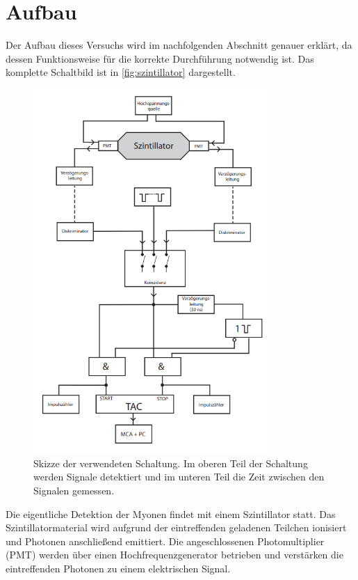 \section{Aufbau}
\label{sec:aufbau}

Der Aufbau dieses Versuchs wird im nachfolgenden Abschnitt genauer erklärt, da dessen Funktionsweise für die korrekte Durchführung notwendig ist.
Das komplette Schaltbild ist in \autoref{fig:szintillator} dargestellt.
\begin{figure}
    \centering
    \includegraphics[width=0.8\textwidth]{content/images/szintillator.png}
    \caption{Skizze der verwendeten Schaltung. Im oberen Teil der Schaltung werden Signale detektiert und im unteren Teil die Zeit zwischen den Signalen gemessen. \cite{V01}}
    \label{fig:szintillator}
\end{figure}
Die eigentliche Detektion der Myonen findet mit einem Szintillator statt.
Das Szintillatormaterial wird aufgrund der eintreffenden geladenen Teilchen ionisiert und Photonen anschließend emittiert.
Die angeschlossenen Photomultiplier (PMT) werden über einen Hochfrequenzgenerator betrieben und verstärken die eintreffenden Photonen zu einem elektrischen Signal.
